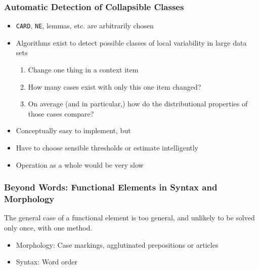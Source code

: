 \documentclass{beamer}
\begin{document}
\begin{frame}
\frametitle{Automatic Detection of Collapsible Classes}

\begin{itemize}
\item {\tt CARD}, {\tt NE}, lemmas, etc. are arbitrarily chosen
\item Algorithms exist to detect possible classes of local variability in large
data sets
\begin{enumerate}
\item Change \alert {one} thing in a context item
\item How many cases exist with only this one item changed?
\item On average (and in particular,) how do the distributional properties of
those cases compare?
\end{enumerate}
\item Conceptually easy to implement, \alert {but}
\item Have to choose sensible thresholds or estimate intelligently
\item Operation as a whole would be very slow
\end{itemize}
\end{frame}

\begin{frame}
\frametitle{Beyond Words: Functional Elements in Syntax and Morphology}
The general case of a functional element is too general, and unlikely to be
solved only once, with one method.
\begin{itemize}
\item Morphology: Case markings, agglutinated prepositions or articles
\item Syntax: Word order
\end{itemize}
\end{frame}
\end{document}
